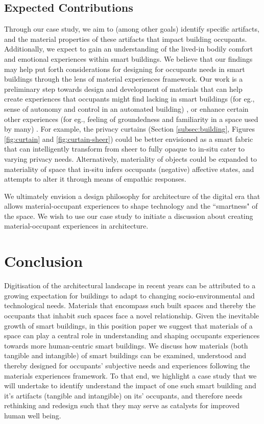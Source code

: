 \documentclass[manuscript, anonymous, review]{acmart}
\begin{document}
\subsection{Expected Contributions}
Through our case study, we aim to (among other goals) identify specific artifacts, and the material properties of these artifacts that impact building occupants. Additionally, we expect to gain an understanding of the lived-in bodily comfort and emotional experiences within smart buildings. We believe that our findings may help put forth considerations for designing for occupants needs in smart buildings through the lens of material experiences framework. Our work is a preliminary step towards design and development of materials that can help create experiences that occupants might find lacking in smart buildings (for eg., sense of autonomy and control in an automated building) \cite{moreno2014user}, or enhance certain other experiences (for eg., feeling of groundedness and familiarity in a space used by many) \cite{rehman2022personalisedcomfort}.  For example, the privacy curtains (Section \ref{subsec:building}, Figures \ref{fig:curtain} and \ref{fig:curtain-sheer}) could be better envisioned as a smart fabric that can intelligently transform from sheer to fully opaque to in-situ cater to varying privacy needs. Alternatively, materiality of objects could be expanded to materiality of space that in-situ infers occupants (negative) affective states, and attempts to alter it through means of empathic responses. 

We ultimately envision a design philosophy for architecture of the digital era that allows material-occupant experiences to shape technology and the ``smartness" of the space. We wish to use our case study to initiate a discussion about creating material-occupant experiences in architecture.


\section{Conclusion}
Digitisation of the architectural landscape in recent years can be attributed to a growing expectation for buildings to adapt to changing socio-environmental and technological needs. Materials that encompass such built spaces and thereby the occupants that inhabit such spaces face a novel relationship. Given the inevitable growth of smart buildings, in this position paper we suggest that materials of a space can play a central role in understanding and shaping occupants experiences towards more human-centric smart buildings. We discuss how materials (both tangible and intangible) of smart buildings can be examined, understood and thereby designed for occupants' subjective needs and experiences following the materials experiences framework. To that end, we highlight a case study that we will undertake to identify understand the impact of one such smart building and it's artifacts (tangible and intangible) on its'  occupants, and therefore needs rethinking and redesign such that they may serve as catalysts for improved human well being. 




\end{document}
